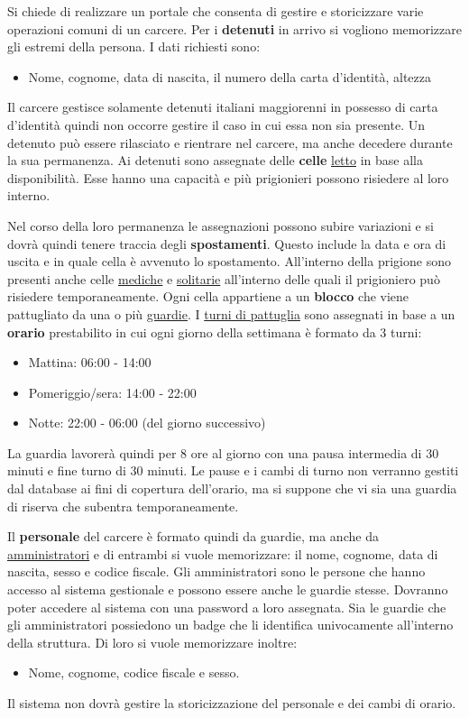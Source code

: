 \documentclass[a4paper,12pt]{report}
\begin{document}
\begin{linenumbers}
\modulolinenumbers[5]
Si chiede di realizzare un portale che consenta di gestire e storicizzare varie operazioni comuni di un carcere. Per i \textbf{detenuti} in arrivo si vogliono memorizzare gli estremi della persona.
%
I dati richiesti sono:
\begin{itemize}
    \item Nome, cognome, data di nascita, il numero della carta d'identità, altezza
\end{itemize}
Il carcere gestisce solamente detenuti italiani maggiorenni in possesso di carta d'identità quindi non occorre gestire il caso in cui essa non sia presente.
%
Un detenuto può essere rilasciato e rientrare nel carcere, ma anche decedere durante la sua permanenza.
%
Ai detenuti sono assegnate delle \textbf{celle} \underline{letto} in base alla disponibilità.
%
Esse hanno una capacità e più prigionieri possono risiedere al loro interno.
%
\par
Nel corso della loro permanenza le assegnazioni possono subire variazioni e si dovrà quindi tenere traccia degli \textbf{spostamenti}.
%
Questo include la data e ora di uscita e in quale cella è avvenuto lo spostamento.
%
All'interno della prigione sono presenti anche celle \underline{mediche} e \underline{solitarie} all'interno delle quali il prigioniero può risiedere temporaneamente.
%
Ogni cella appartiene a un \textbf{blocco} che viene pattugliato da una o più \underline{guardie}.
%
I \underline{turni di pattuglia} sono assegnati in base a un \textbf{orario} prestabilito in cui ogni giorno della settimana è formato da 3 turni:
\begin{itemize}
    \item Mattina: 06:00 - 14:00
    \item Pomeriggio/sera: 14:00 - 22:00
    \item Notte: 22:00 - 06:00 (del giorno successivo)
\end{itemize}   
La guardia lavorerà quindi per 8 ore al giorno con una pausa intermedia di 30 minuti e fine turno di 30 minuti.
%
Le pause e i cambi di turno non verranno gestiti dal database ai fini di copertura dell'orario, ma si suppone che vi sia una guardia di riserva che subentra temporaneamente.
%
\par Il \textbf{personale} del carcere è formato quindi da guardie, ma anche da \underline{amministratori} e di entrambi si vuole memorizzare: il nome, cognome, data di nascita, sesso e codice fiscale.
%
Gli amministratori sono le persone che hanno accesso al sistema gestionale e possono essere anche le guardie stesse.
%
Dovranno poter accedere al sistema con una password a loro assegnata.
%
Sia le guardie che gli amministratori possiedono un badge che li identifica univocamente all'interno della struttura.
%
Di loro si vuole memorizzare inoltre:
\begin{itemize}
    \item Nome, cognome, codice fiscale e sesso.
\end{itemize}
Il sistema non dovrà gestire la storicizzazione del personale e dei cambi di orario.
\end{linenumbers}
\end{document}
